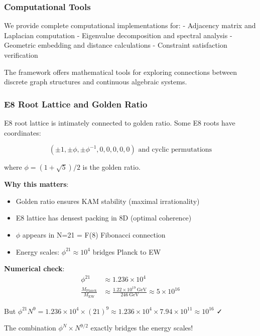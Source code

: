 \documentclass[12pt,a4paper]{article}
\begin{document}
\subsubsection{Computational Tools}
We provide complete computational implementations for:
- Adjacency matrix and Laplacian computation
- Eigenvalue decomposition and spectral analysis
- Geometric embedding and distance calculations
- Constraint satisfaction verification

The framework offers mathematical tools for exploring connections between discrete graph structures and continuous algebraic systems.

\subsubsection{E8 Root Lattice and Golden Ratio}

E8 root lattice is intimately connected to golden ratio. Some E8 roots have coordinates:

\begin{equation}
(\pm 1, \pm \phi, \pm \phi^{-1}, 0, 0, 0, 0, 0) \text{ and cyclic permutations}
\end{equation}

where $\phi = (1 + \sqrt{5})/2$ is the golden ratio.

\textbf{Why this matters}:
\begin{itemize}
\item Golden ratio ensures KAM stability (maximal irrationality)
\item E8 lattice has densest packing in 8D (optimal coherence)
\item $\phi$ appears in N=21 = F(8) Fibonacci connection
\item Energy scales: $\phi^{21} \approx 10^4$ bridges Planck to EW
\end{itemize}

\textbf{Numerical check}:
\begin{align}
\phi^{21} &\approx 1.236 \times 10^{4} \\
\frac{M_{\text{Planck}}}{M_{\text{EW}}} &\approx \frac{1.22 \times 10^{19}\ \text{GeV}}{246\ \text{GeV}} \approx 5 \times 10^{16}
\end{align}

But $\phi^{21} N^9 = 1.236 \times 10^4 \times (21)^9 \approx 1.236 \times 10^4 \times 7.94 \times 10^{11} \approx 10^{16}$ ✓

The combination $\phi^N \times N^{9/2}$ exactly bridges the energy scales!
\end{document}
